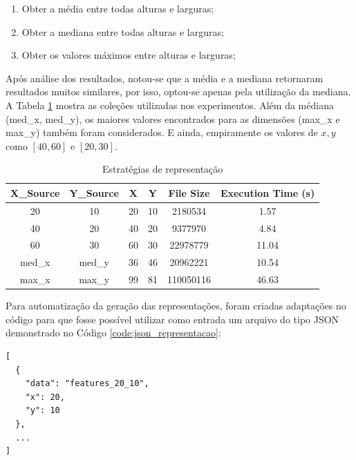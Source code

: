 \documentclass[12pt]{article}
\begin{document}
\begin{enumerate}
  \item Obter a média entre todas alturas e larguras;
  \item Obter a mediana entre todas alturas e larguras;
  \item Obter os valores máximos entre alturas e larguras;
\end{enumerate}

Após análise dos resultados, notou-se que a média e a mediana retornaram resultados muitos similares, por isso, optou-se apenas pela utilização da mediana. A Tabela \ref{tab:estrategias_representacao} mostra as coleções utilizadas nos experimentos. Além da médiana (med\_x, med\_y), os maiores valores encontrados para as dimensões (max\_x e max\_y) também foram considerados. E ainda, empiramente os valores de $x,y$ como $[40,60]$ e $[20,30]$.

\begin{table}[!htb]
  \centering
  \begin{tabular}{|c|c|c|c|c|c|}
  \hline
  \textbf{X\_Source} & \textbf{Y\_Source} & \textbf{X} & \textbf{Y} & \textbf{File Size} & \textbf{Execution Time (s)} \\ \hline
  20                 & 10                 & 20         & 10         & 2180534            & 1.57                    \\ \hline
  40                 & 20                 & 40         & 20         & 9377970            & 4.84                    \\ \hline
  60                 & 30                 & 60         & 30         & 22978779           & 11.04                   \\ \hline
  med\_x             & med\_y             & 36         & 46         & 20962221           & 10.54                   \\ \hline
  max\_x             & max\_y             & 99         & 81         & 110050116          & 46.63                   \\ \hline
  \end{tabular}
  \caption{Estratégias de representação}
  \label{tab:estrategias_representacao}
\end{table}

Para automatização da geração das representações, foram criadas adaptações no código para que fosse possível utilizar como entrada um arquivo do tipo JSON demonstrado no Código \ref{code:json_representacao}:

\begin{lstlisting}[caption={JSON para representações},captionpos=b,frame=single,label={code:json_representacao}]
[
  {
    "data": "features_20_10",
    "x": 20,
    "y": 10
  },
  ...
]
\end{lstlisting}
\end{document}

